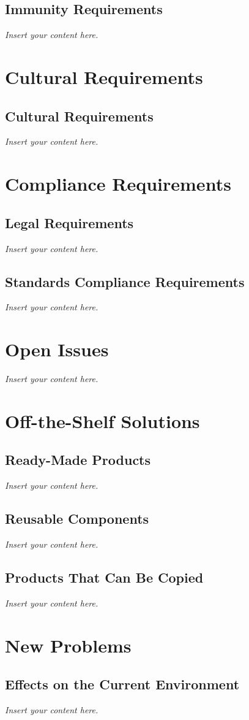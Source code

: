 \documentclass[12pt]{article}
\newcommand{\lips}{\textit{Insert your content here.}}
\begin{document}
\subsection{Immunity Requirements}
\lips

\section{Cultural Requirements}
\subsection{Cultural Requirements}
\lips

\section{Compliance Requirements}
\subsection{Legal Requirements}
\lips
\subsection{Standards Compliance Requirements}
\lips

\section{Open Issues}
\lips

\section{Off-the-Shelf Solutions}
\subsection{Ready-Made Products}
\lips
\subsection{Reusable Components}
\lips
\subsection{Products That Can Be Copied}
\lips

\section{New Problems}
\subsection{Effects on the Current Environment}
\lips
\end{document}
